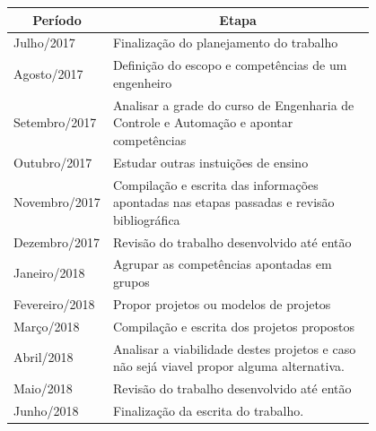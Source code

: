\documentclass[12pt]{article} %
\begin{document}
\begin{table}[htbp]
\centering
\begin{tabular}{|l|p{0.8\linewidth}|}
\hline
\multicolumn{1}{|c|}{\textbf{Período}} & \multicolumn{1}{c|}{\textbf{Etapa}}                                                   \tabularnewline \hline
Julho/2017                                              & Finalização do planejamento do trabalho
\tabularnewline \hline
Agosto/2017                                             & Definição do escopo e competências de um engenheiro
\tabularnewline \hline
Setembro/2017                                           & Analisar a grade do curso de Engenharia de Controle e Automação e apontar competências
\tabularnewline \hline
Outubro/2017                      		      			  & Estudar outras instuições de ensino
\tabularnewline \hline
Novembro/2017                      		      	      & Compilação e escrita das informações apontadas nas etapas passadas e revisão bibliográfica                                                                                                     \tabularnewline \hline	
Dezembro/2017                                           & Revisão do trabalho desenvolvido até então
\tabularnewline \hline
Janeiro/2018                                            & Agrupar as competências apontadas em grupos
\tabularnewline \hline
Fevereiro/2018                                          & Propor projetos ou modelos de projetos
\tabularnewline \hline
Março/2018                                          	  & Compilação e escrita dos projetos propostos
\tabularnewline \hline
Abril/2018                                            	  & Analisar a viabilidade destes projetos e caso não sejá viavel propor alguma alternativa.
\tabularnewline \hline
Maio/2018                                            	  & Revisão do trabalho desenvolvido até então
\tabularnewline \hline
Junho/2018                                            	  & Finalização da escrita do trabalho.

\tabularnewline \hline
\end{tabular}
\end{table}
\end{document}
